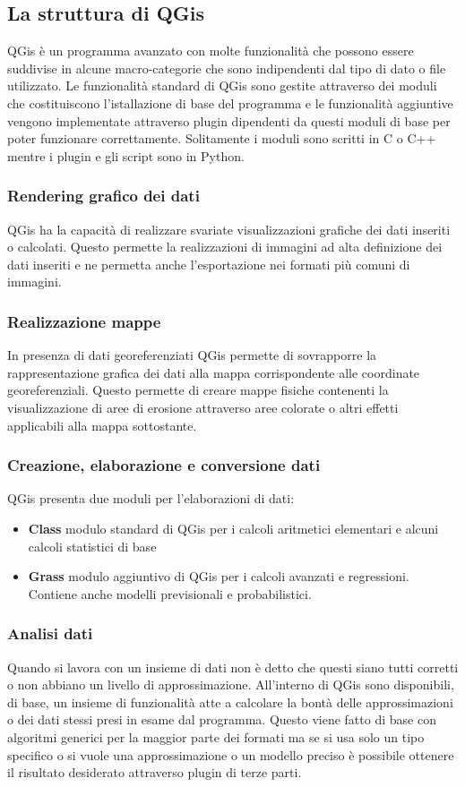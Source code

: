 \subsection{La struttura di QGis}
QGis è un programma avanzato con molte funzionalità che possono essere suddivise in alcune macro-categorie che sono indipendenti dal tipo di dato o file utilizzato.
Le funzionalità standard di QGis sono gestite attraverso dei moduli che costituiscono l'istallazione di base del programma e le funzionalità aggiuntive vengono implementate attraverso plugin dipendenti da questi moduli di base per poter funzionare correttamente.
Solitamente i moduli sono scritti in C o C++ mentre i plugin e gli script sono in Python.

\subsubsection{Rendering grafico dei dati}
QGis ha la capacità di realizzare svariate visualizzazioni grafiche dei dati inseriti o calcolati.
Questo permette la realizzazioni di immagini ad alta definizione dei dati inseriti e ne permetta anche l'esportazione nei formati più comuni di immagini.

\subsubsection{Realizzazione mappe}
In presenza di dati georeferenziati QGis permette di sovrapporre la rappresentazione grafica dei dati alla mappa corrispondente alle coordinate georeferenziali.
Questo permette di creare mappe fisiche contenenti la visualizzazione di aree di erosione attraverso aree colorate o altri effetti applicabili alla mappa sottostante.

\subsubsection{Creazione, elaborazione e conversione dati}
QGis presenta due moduli per l'elaborazioni di dati:
\begin{itemize}
	\item \textbf{Class} modulo standard di QGis per i calcoli aritmetici elementari e alcuni calcoli statistici di base
	\item \textbf{Grass} modulo aggiuntivo di QGis per i calcoli avanzati e regressioni. Contiene anche modelli previsionali e probabilistici.
\end{itemize}

\subsubsection{Analisi dati}
Quando si lavora con un insieme di dati non è detto che questi siano tutti corretti o non abbiano un livello di approssimazione.
All'interno di QGis sono disponibili, di base, un insieme di funzionalità atte a calcolare la bontà delle approssimazioni o dei dati stessi presi in esame dal programma.
Questo viene fatto di base con algoritmi generici per la maggior parte dei formati ma se si usa solo un tipo specifico o si vuole una approssimazione o un modello preciso è possibile ottenere il risultato desiderato attraverso plugin di terze parti.

